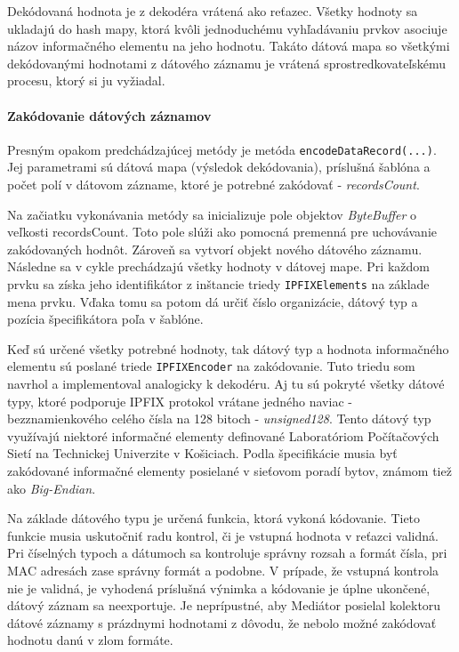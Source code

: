 Dekódovaná hodnota je z dekodéra vrátená ako reťazec. Všetky hodnoty sa ukladajú do hash mapy, ktorá 
kvôli jednoduchému vyhľadávaniu prvkov asociuje názov informačného elementu na jeho hodnotu. 
Takáto dátová mapa so všetkými dekódovanými hodnotami z dátového záznamu je vrátená sprostredkovateľskému 
procesu, ktorý si ju vyžiadal.


\paragraph{Zakódovanie dátových záznamov} 
Presným opakom predchádzajúcej metódy je metóda \verb|encodeDataRecord(...)|. Jej parametrami sú dátová 
mapa (výsledok dekódovania), príslušná šablóna a počet polí v dátovom zázname, ktoré je potrebné 
zakódovať - \emph{recordsCount}.

Na začiatku vykonávania metódy sa inicializuje pole objektov \emph{ByteBuffer} o veľkosti recordsCount.
Toto pole slúži ako pomocná premenná pre uchovávanie zakódovaných hodnôt. Zároveň sa vytvorí objekt 
nového dátového záznamu.
Následne sa v cykle prechádzajú všetky hodnoty v dátovej mape. Pri každom prvku sa získa jeho identifikátor
z inštancie triedy \verb|IPFIXElements| na základe mena prvku. Vďaka tomu sa potom dá určiť číslo
organizácie, dátový typ a pozícia špecifikátora poľa v šablóne. 

Keď sú určené všetky potrebné hodnoty, tak dátový typ a hodnota informačného elementu sú poslané triede 
\verb|IPFIXEncoder| na zakódovanie. Tuto triedu som navrhol a implementoval analogicky k dekodéru. 
Aj tu sú pokryté všetky dátové typy, ktoré podporuje IPFIX protokol vrátane jedného naviac - bezznamienkového
celého čísla na 128 bitoch - \emph{unsigned128}. Tento dátový typ využívajú niektoré informačné elementy 
definované Laboratóriom Počítačových Sietí na Technickej Univerzite v Košiciach. Podla špecifikácie
\citep{rfc5101} musia byť zakódované informačné elementy posielané v sieťovom poradí bytov, známom 
tiež ako \emph{Big-Endian}. 

Na základe dátového typu je určená funkcia, ktorá vykoná kódovanie. 
Tieto funkcie musia uskutočniť radu kontrol, či je vstupná hodnota v reťazci validná. 
Pri číselných typoch a dátumoch sa kontroluje správny rozsah a formát čísla, pri MAC adresách zase 
správny formát a podobne.
V prípade, že vstupná kontrola nie je validná, je vyhodená príslušná výnimka a 
kódovanie je úplne ukončené, dátový záznam sa neexportuje. Je neprípustné, aby Mediátor posielal kolektoru
dátové záznamy s prázdnymi hodnotami z dôvodu, že nebolo možné zakódovať hodnotu danú v zlom formáte.  

